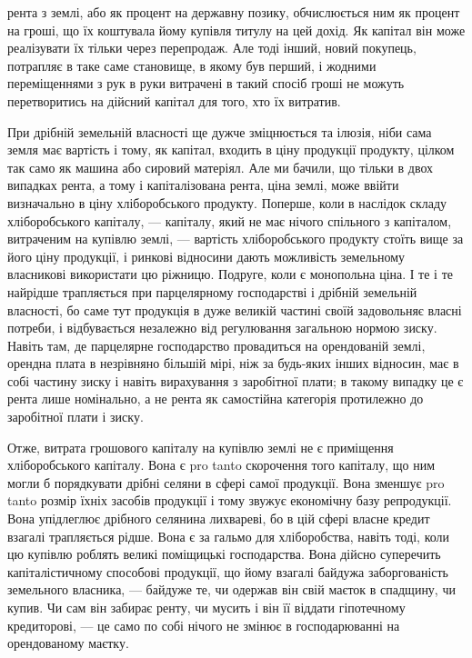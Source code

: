 \parcont{}  %
рента з землі, або як процент на державну позику, обчислюється ним як процент
на гроші, що їх коштувала йому купівля титулу на цей дохід. Як капітал
він може реалізувати їх тільки через перепродаж. Але тоді інший, новий покупець,
потрапляє в таке саме становище, в якому був перший, і жодними переміщеннями
з рук в руки витрачені в такий спосіб гроші не можуть перетворитись
на дійсний капітал для того, хто їх витратив.

При дрібній земельній власності ще дужче зміцнюється та ілюзія, ніби
сама земля має вартість і тому, як капітал, входить в ціну продукції продукту,
цілком так само як машина або сировий матеріял. Але ми бачили, що тільки
в двох випадках рента, а тому і капіталізована рента, ціна землі, може ввійти
визначально в ціну хліборобського продукту. Поперше, коли в наслідок складу
хліборобського капіталу, — капіталу, який не має нічого спільного з капіталом,
витраченим на купівлю землі, — вартість хліборобського продукту стоїть вище за
його ціну продукції, і ринкові відносини дають можливість земельному власникові
використати цю ріжницю. Подруге, коли є монопольна ціна. І те і те
найрідше трапляється при парцелярному господарстві і дрібній земельній
власності, бо саме тут продукція в дуже великій частині своїй задовольняє
власні потреби, і відбувається незалежно від регулювання загальною нормою
зиску. Навіть там, де парцелярне господарство провадиться на орендованій землі,
орендна плата в незрівняно більшій мірі, ніж за будь-яких інших відносин,
має в собі частину зиску і навіть вирахування з заробітної плати; в такому
випадку це є рента лише номінально, а не рента як самостійна категорія
протилежно до заробітної плати і зиску.

Отже, витрата грошового капіталу на купівлю землі не є приміщення хліборобського
капіталу. Вона є pro tanto скорочення того капіталу, що ним могли б
порядкувати дрібні селяни в сфері самої продукції. Вона зменшує pro tanto розмір
їхніх засобів продукції і тому звужує економічну базу репродукції. Вона
упідлеглює дрібного селянина лихвареві, бо в цій сфері власне кредит взагалі
трапляється рідше. Вона є за гальмо для хліборобства, навіть тоді, коли цю
купівлю роблять великі поміщицькі господарства. Вона дійсно суперечить капіталістичному
способові продукції, що йому взагалі байдужа заборгованість
земельного власника, — байдуже те, чи одержав він свій маєток в спадщину, чи
купив. Чи сам він забирає ренту, чи мусить і він її віддати гіпотечному кредиторові,
— це само по собі нічого не змінює в господарюванні на орендованому
маєтку.

